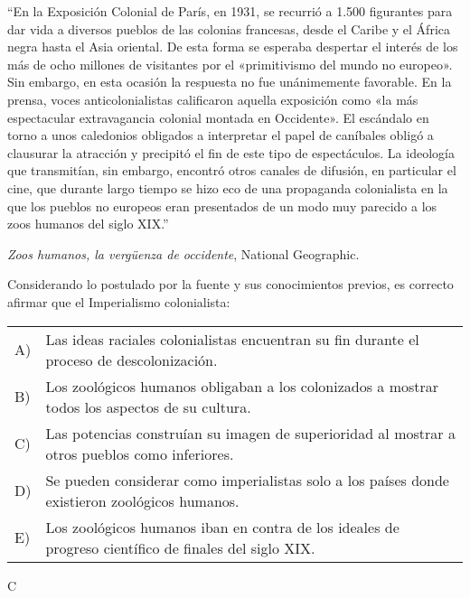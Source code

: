 \documentclass[letterpaper,11pt]{article}
\newcommand{\anchopregunta}{0.9\textwidth}
\begin{document}
\begin{enumerate}
\begin{minipage}{\anchopregunta}
\item ``En la Exposición Colonial de París, en 1931, se recurrió a 1.500 figurantes para dar vida a diversos pueblos de las colonias francesas, desde el Caribe y el África negra hasta el Asia oriental. De esta forma se esperaba despertar el interés de los más de ocho millones de visitantes por el «primitivismo del mundo no europeo».
Sin embargo, en esta ocasión la respuesta no fue unánimemente favorable. En la prensa, voces anticolonialistas calificaron aquella exposición como «la más espectacular extravagancia colonial montada en Occidente». El escándalo en torno a unos caledonios obligados a interpretar el papel de caníbales obligó a clausurar la atracción y precipitó el fin de este tipo de espectáculos. La ideología que transmitían, sin embargo, encontró otros canales de difusión, en particular el cine, que durante largo tiempo se hizo eco de una propaganda colonialista en la que los pueblos no europeos eran presentados de un modo muy parecido a los zoos humanos del siglo XIX.''\\
\begin{flushright}
\textit{Zoos humanos, la vergüenza de occidente}, National Geographic.
\end{flushright}
Considerando lo postulado por la fuente y sus conocimientos previos, es correcto afirmar que el Imperialismo colonialista: 
\begin{flushleft}\begin{tabular}{@{\hspace{-.001\textwidth}}l@{\hspace{2pt}}p{}}
A)& Las ideas raciales colonialistas encuentran su fin durante el proceso de descolonización.\\
B)& Los zoológicos humanos obligaban a los colonizados a mostrar todos los aspectos de su cultura.\\
C)& Las potencias construían su imagen de superioridad al mostrar a otros pueblos como inferiores.\\
D)& Se pueden considerar como imperialistas solo a los países donde existieron zoológicos humanos.\\
E)& Los zoológicos humanos iban en contra de los ideales de progreso científico de finales del siglo XIX.\\ 
\end{tabular}\end{flushleft}%
\begin{key} C
\end{key} 

\end{minipage}
\end{enumerate}
\end{document}
